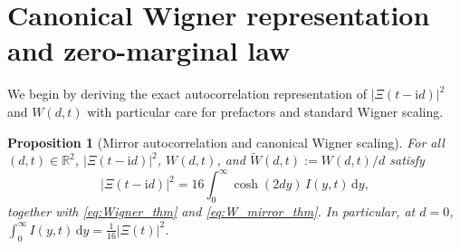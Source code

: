 \documentclass[11pt,a4paper,reqno]{amsart}
\newtheorem{proposition}[theorem]{Proposition}
\theoremstyle{definition}
\theoremstyle{remark}
\numberwithin{equation}{section}
\newcommand{\dd}{\mathrm{d}}
\newcommand{\ii}{\mathrm{i}}
\newcommand{\Wtil}{\widetilde{W}}
\begin{document}
\section{Canonical Wigner representation and zero-marginal law}\label{sec:wigner}

We begin by deriving the exact autocorrelation representation of $|\Xi(t-\ii d)|^2$ and $W(d,t)$ with particular care for prefactors and standard Wigner scaling.

\begin{proposition}[Mirror autocorrelation and canonical Wigner scaling]\label{prop:mirror_wigner}
For all $(d,t) \in \mathbb{R}^2$, $|\Xi(t-\ii d)|^2$, $W(d,t)$, and $\Wtil(d,t) := W(d,t)/d$ satisfy
\begin{equation}\label{eq:mod_Xi_sq}
\big|\Xi(t-\ii d)\big|^2 = 16\int_0^\infty \cosh(2d y)\,I(y,t)\,\dd y,
\end{equation}
together with \eqref{eq:Wigner_thm} and \eqref{eq:W_mirror_thm}. In particular, at $d = 0$, $\int_0^\infty I(y,t)\,\dd y = \frac{1}{16}|\Xi(t)|^2$.
\end{proposition}
\end{document}
